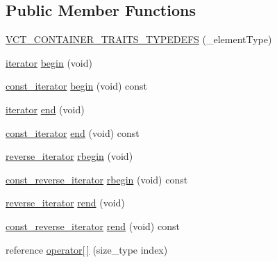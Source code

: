 \subsection*{Public Member Functions}
\begin{DoxyCompactItemize}
\item 
\hyperlink{classvct_fixed_size_vector_base_ab3b054b9aab3d18bede3625dc21e7e03}{V\+C\+T\+\_\+\+C\+O\+N\+T\+A\+I\+N\+E\+R\+\_\+\+T\+R\+A\+I\+T\+S\+\_\+\+T\+Y\+P\+E\+D\+E\+F\+S} (\+\_\+element\+Type)
\item 
\hyperlink{classvct_fixed_size_const_vector_base_ad0ba9b13bb2515695b4e44290bdbaa5d}{iterator} \hyperlink{classvct_fixed_size_vector_base_a33701a89bb47502755bddcae4f90a3f9}{begin} (void)
\item 
\hyperlink{classvct_fixed_size_const_vector_base_abc547e0542bb6f7d92876a56c7ea5cdc}{const\+\_\+iterator} \hyperlink{classvct_fixed_size_vector_base_a19fa87360c79625bcf41d47e81a4ac22}{begin} (void) const 
\item 
\hyperlink{classvct_fixed_size_const_vector_base_ad0ba9b13bb2515695b4e44290bdbaa5d}{iterator} \hyperlink{classvct_fixed_size_vector_base_aeca0ac3cfb6e9ba38c26156a10ac29a6}{end} (void)
\item 
\hyperlink{classvct_fixed_size_const_vector_base_abc547e0542bb6f7d92876a56c7ea5cdc}{const\+\_\+iterator} \hyperlink{classvct_fixed_size_vector_base_a53ee162a91db4000127322aea2ae017b}{end} (void) const 
\item 
\hyperlink{classvct_fixed_size_const_vector_base_ae22e8ced509e202d00620f384ac3a5b2}{reverse\+\_\+iterator} \hyperlink{classvct_fixed_size_vector_base_a82f6ae2d7b99a575ecc37d85546e02b4}{rbegin} (void)
\item 
\hyperlink{classvct_fixed_size_const_vector_base_acd0a5fe64ff3551c45cebfb2ba81cf10}{const\+\_\+reverse\+\_\+iterator} \hyperlink{classvct_fixed_size_vector_base_a818b388afd102d44b0f891a4569412fc}{rbegin} (void) const 
\item 
\hyperlink{classvct_fixed_size_const_vector_base_ae22e8ced509e202d00620f384ac3a5b2}{reverse\+\_\+iterator} \hyperlink{classvct_fixed_size_vector_base_a8139ac1cfaa84e3339a7d03389f99b1a}{rend} (void)
\item 
\hyperlink{classvct_fixed_size_const_vector_base_acd0a5fe64ff3551c45cebfb2ba81cf10}{const\+\_\+reverse\+\_\+iterator} \hyperlink{classvct_fixed_size_vector_base_a137196da03a3ea70202da0db8e02afa9}{rend} (void) const 
\item 
reference \hyperlink{classvct_fixed_size_vector_base_afac291ac9bf689086e7095daada45dee}{operator\mbox{[}$\,$\mbox{]}} (size\+\_\+type index)

\end{DoxyCompactItemize}
